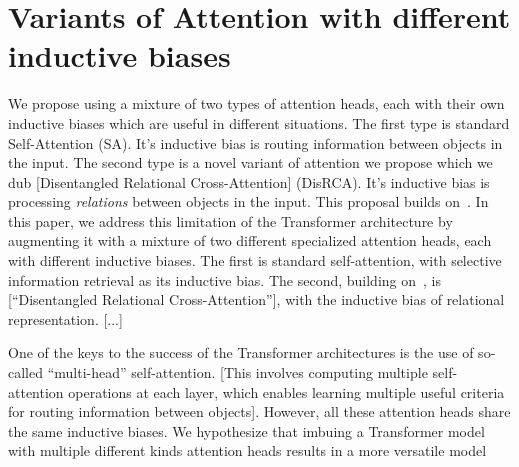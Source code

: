 \section{Variants of Attention with different inductive biases}

We propose using a mixture of two types of attention heads, each with their own inductive biases which are useful in different situations. The first type is standard Self-Attention (SA). It's inductive bias is routing information between objects in the input. The second type is a novel variant of attention we propose which we dub [Disentangled Relational Cross-Attention] (DisRCA). It's inductive bias is processing \textit{relations} between objects in the input. This proposal builds on~\citep{altabaa2024abstractors}. In this paper, we address this limitation of the Transformer architecture by augmenting it with a mixture of two different specialized attention heads, each with different inductive biases. The first is standard self-attention, with selective information retrieval as its inductive bias. The second, building on~\citet{altabaa2024abstractors}, is [``Disentangled Relational Cross-Attention''], with the inductive bias of relational representation. [...]

One of the keys to the success of the Transformer architectures is the use of so-called ``multi-head'' self-attention. [This involves computing multiple self-attention operations at each layer, which enables learning multiple useful criteria for routing information between objects]. However, all these attention heads share the same inductive biases. We hypothesize that imbuing a Transformer model with multiple different kinds attention heads results in a more versatile model 


